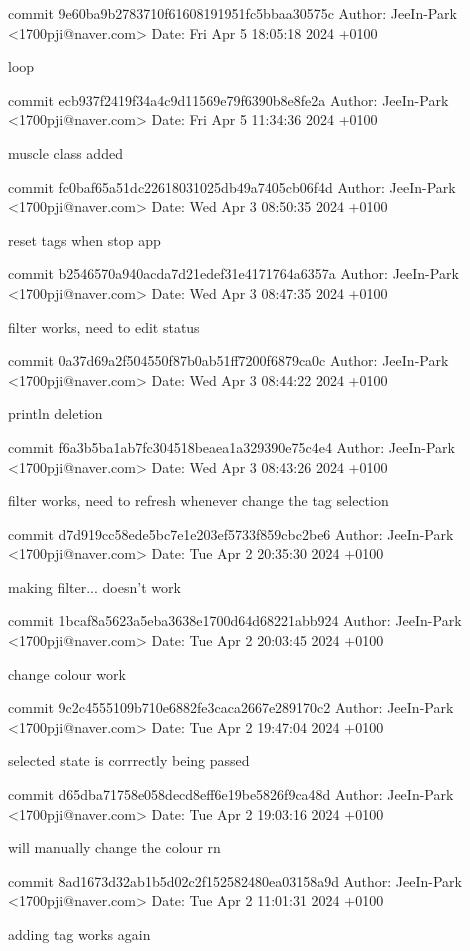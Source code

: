 commit 9e60ba9b2783710f61608191951fc5bbaa30575c
Author: JeeIn-Park <1700pji@naver.com>
Date:   Fri Apr 5 18:05:18 2024 +0100

    loop

commit ecb937f2419f34a4c9d11569e79f6390b8e8fe2a
Author: JeeIn-Park <1700pji@naver.com>
Date:   Fri Apr 5 11:34:36 2024 +0100

    muscle class added

commit fc0baf65a51dc22618031025db49a7405cb06f4d
Author: JeeIn-Park <1700pji@naver.com>
Date:   Wed Apr 3 08:50:35 2024 +0100

    reset tags when stop app

commit b2546570a940acda7d21edef31e4171764a6357a
Author: JeeIn-Park <1700pji@naver.com>
Date:   Wed Apr 3 08:47:35 2024 +0100

    filter works, need to edit status

commit 0a37d69a2f504550f87b0ab51ff7200f6879ca0c
Author: JeeIn-Park <1700pji@naver.com>
Date:   Wed Apr 3 08:44:22 2024 +0100

    println deletion

commit f6a3b5ba1ab7fc304518beaea1a329390e75c4e4
Author: JeeIn-Park <1700pji@naver.com>
Date:   Wed Apr 3 08:43:26 2024 +0100

    filter works, need to refresh whenever change the tag selection

commit d7d919cc58ede5bc7e1e203ef5733f859cbc2be6
Author: JeeIn-Park <1700pji@naver.com>
Date:   Tue Apr 2 20:35:30 2024 +0100

    making filter... doesn't work

commit 1bcaf8a5623a5eba3638e1700d64d68221abb924
Author: JeeIn-Park <1700pji@naver.com>
Date:   Tue Apr 2 20:03:45 2024 +0100

    change colour work

commit 9c2c4555109b710e6882fe3caca2667e289170c2
Author: JeeIn-Park <1700pji@naver.com>
Date:   Tue Apr 2 19:47:04 2024 +0100

    selected state is corrrectly being passed

commit d65dba71758e058decd8eff6e19be5826f9ca48d
Author: JeeIn-Park <1700pji@naver.com>
Date:   Tue Apr 2 19:03:16 2024 +0100

    will manually change the colour rn

commit 8ad1673d32ab1b5d02c2f152582480ea03158a9d
Author: JeeIn-Park <1700pji@naver.com>
Date:   Tue Apr 2 11:01:31 2024 +0100

    adding tag works again

